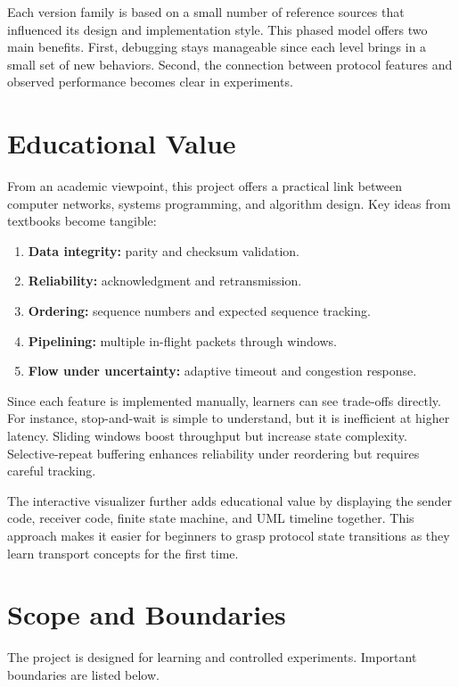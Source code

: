Each version family is based on a small number of reference sources that
influenced its design and implementation style. This phased model offers two
main benefits. First, debugging stays manageable since each level brings in a
small set of new behaviors. Second, the connection between protocol features
and observed performance becomes clear in experiments.

\clearpage
\section{Educational Value}
From an academic viewpoint, this project offers a practical link between computer networks, systems programming, and algorithm design. Key ideas from textbooks become tangible:

\begin{enumerate}
	\item \textbf{Data integrity:} parity and checksum validation.
	\item \textbf{Reliability:} acknowledgment and retransmission.
	\item \textbf{Ordering:} sequence numbers and expected sequence tracking.
	\item \textbf{Pipelining:} multiple in-flight packets through windows.
	\item \textbf{Flow under uncertainty:} adaptive timeout and congestion
	response.
\end{enumerate}

\vspace{\baselineskip}

Since each feature is implemented manually, learners can see trade-offs directly. For instance, stop-and-wait is simple to understand, but it is inefficient at higher latency. Sliding windows boost throughput but increase state complexity. Selective-repeat buffering enhances reliability under reordering but requires careful tracking.

The interactive visualizer further adds educational value by displaying the sender code, receiver code, finite state machine, and UML timeline together. This approach makes it easier for beginners to grasp protocol state transitions as they learn transport concepts for the first time.

\clearpage
\section{Scope and Boundaries}
The project is designed for learning and controlled experiments. Important
boundaries are listed below.

